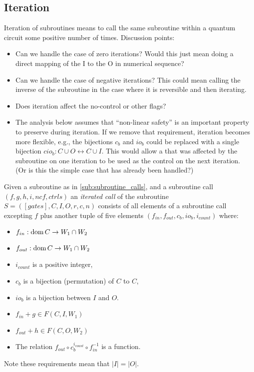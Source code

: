 \subsection{Iteration} %
\label{sub:iteration}
Iteration of subroutines means to call the same subroutine
within a quantum circuit some positive number of times.
Discussion points:
\begin{itemize}
  \item Can we handle the case of zero iterations? Would this
  just mean doing a direct mapping of the I to the O
  in numerical sequence?
  \item Can we handle the case of negative iterations? This could
  mean calling the inverse of the subroutine in the case
  where it is reversible and then iterating.
  \item Does iteration affect the no-control or other flags?
  \item The analysis below assumes that ``non-linear safety'' is
  an important property to preserve during iteration.
  If we remove that requirement, iteration becomes more flexible,
  e.g., the bijections $c_b$ and $io_b$ could be
  replaced with a single bijection $cio_b : C\cup O \leftrightarrow C\cup I$.
  This would allow a \qubit that was
  affected by the subroutine on one iteration to be used as the
  control on the next iteration. (Or is this the simple
  case that has already been handled?)
\end{itemize}
\begin{definition}\label{def:iterated_subroutine_call}
  Given a subroutine as in \vref{sub:subroutine_calls},
  and a subroutine call $(f,g,h,i,ncf,ctrls)$
  an \emph{iterated call} of the subroutine
  $S = ([gates],C,I,O,r,c,n)$ consists of all elements of a
  subroutine call excepting $f$ plus another
  tuple of five elements $(f_{in},f_{out},c_b,io_b,i_{count})$
  where:
  \begin{itemize}
    \item $f_{in}:\operatorname*{dom} C \to W_1\cap W_2$
    \item $f_{out}:\operatorname*{dom} C \to W_1\cap W_2$
    \item $i_{count}$ is a positive integer,
    \item $c_b$ is a bijection (permutation) of $C$ to $C$,
    \item $io_b$ is a bijection between $I$ and $O$.
    \item $f_{in}+ g \in F(C,I,W_1)$
    \item $f_{out}+ h \in F(C,O,W_2)$
    \item The relation $f_{out} \circ c_b^{i_{count}} \circ f_{in}^{-1}$
    is a function.
  \end{itemize}
  Note these requirements mean that $|I| = |O|$.
\end{definition}

